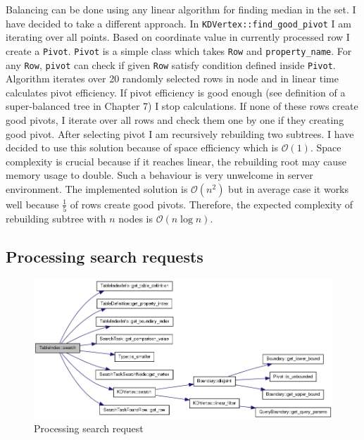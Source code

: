 \documentclass[10pt,a4paper]{article}
\newcommand{\Oh}{\mathcal{O}}
\begin{document}
Balancing can be done using any linear algorithm for finding median in the set. I have decided to take a different approach. In \verb|KDVertex::find_good_pivot| I am iterating over all points. Based on coordinate value in currently processed row I create a \verb|Pivot|. \verb|Pivot| is a simple class which takes \verb|Row| and \verb|property_name|. For any \verb|Row|, \verb|pivot| can check if given \verb|Row| satisfy condition defined inside \verb|Pivot|. Algorithm iterates over 20 randomly selected rows in node and in linear time calculates pivot efficiency. If pivot efficiency is good enough (see definition of a super-balanced tree in Chapter 7) I stop calculations. If none of these rows create good pivots, I iterate over all rows and check them one by one if they creating good pivot. After selecting pivot I am recursively rebuilding two subtrees. I have decided to use this solution because of space efficiency which is $\Oh(1)$. Space complexity is crucial because if it reaches linear, the rebuilding root may cause memory usage to double. Such a behaviour is very unwelcome in server environment. The implemented solution is $\Oh(n^2)$ but in average case it works well because $\frac{1}{5}$ of rows create good pivots. Therefore, the expected complexity of rebuilding subtree with $n$ nodes is $\Oh(n \log n)$.

\subsection{Processing search requests}

\begin{figure}
\centering
  \includegraphics[width=16cm]{search}
  \caption{Processing search request}
  \label{fig:search}
\end{figure}
\end{document}
